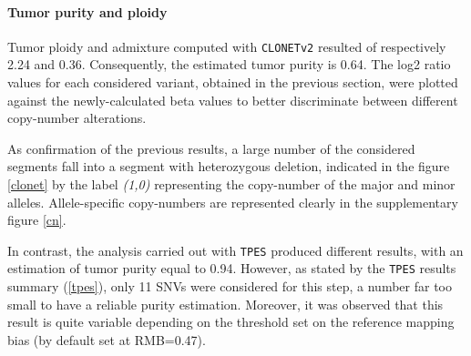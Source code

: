 \documentclass[11pt]{article}
\begin{document}
\paragraph{Tumor purity and ploidy}

Tumor ploidy and admixture computed with \texttt{CLONETv2} resulted of respectively 2.24 and 0.36. Consequently, the estimated tumor purity is 0.64. The log2 ratio values for each considered variant, obtained in the previous section, were plotted against the newly-calculated beta values to better discriminate between different copy-number alterations.

As confirmation of the previous results, a large number of the considered segments fall into a segment with heterozygous deletion, indicated in the figure \ref{clonet} by the label \textit{(1,0)} representing the copy-number of the major and minor alleles. Allele-specific copy-numbers are represented clearly in the supplementary figure \ref{cn}.

In contrast, the analysis carried out with \texttt{TPES} produced different results, with an estimation of tumor purity equal to 0.94. However, as stated by the \texttt{TPES} results summary (\ref{tpes}), only 11 SNVs were considered for this step, a number far too small to have a reliable purity estimation. Moreover, it was observed that this result is quite variable depending on the threshold set on the reference mapping bias (by default set at RMB=0.47).
\end{document}
